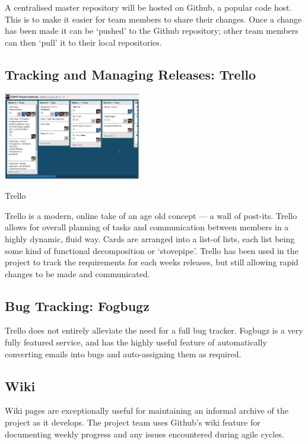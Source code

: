 \begin{fullwidth}
A centralised master repository will be hosted on Github, a popular code host. 
This is to make it easier for team members to share their changes. Once a change has been made
it can be `pushed' to the Github repository; other team members can then `pull' it to their local
repositories.

\subsection{Tracking and Managing Releases: Trello}

\begin{marginfigure}
	\includegraphics[width=6cm]{res/trello.png}
	\caption{Trello}
	\label{fig:trello}
\end{marginfigure}

Trello is a modern, online take of an age old concept --- a wall of post-its. Trello allows for overall planning of tasks and communication between members in a highly dynamic, fluid way. Cards are arranged into a list-of lists, each list being some kind of functional decomposition or `stovepipe'. Trello has been used in the project to track the requirements for each weeks releases, but still allowing rapid changes to be made and communicated.

\subsection{Bug Tracking: Fogbugz}

Trello does not entirely alleviate the need for a full bug tracker. Fogbugz is a very fully featured service, and has the highly useful feature of automatically converting emails into bugs and auto-assigning them as required.

\subsection{Wiki}
Wiki pages are exceptionally useful for maintaining an informal archive of the project as it develops. The project team uses Github's wiki feature for documenting weekly progress and any issues encountered during agile cycles.


\end{fullwidth}
